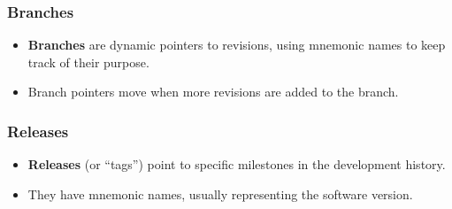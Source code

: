 \documentclass[aspectratio=169,xcolor=table]{beamer}
\begin{document}
    \begin{frame}
        \frametitle{Branches}
        \begin{block}{}
            \begin{itemize}
                \item \textbf{Branches} are dynamic pointers to revisions,
                    using mnemonic names to keep track of their purpose.
                \item Branch pointers move when more revisions are added to the
                    branch.
            \end{itemize}
        \end{block}
        \vfill
        \begin{figure}
            \centering
            \scalebox{0.8}{}
        \end{figure}
    \end{frame}

    \begin{frame}
        \frametitle{Releases}
        \begin{block}{}
            \begin{itemize}
                \item \textbf{Releases} (or ``tags'') point to specific
                    milestones in the development history.
                \item They have mnemonic names, usually representing the
                    software version.
            \end{itemize}
        \end{block}
        \vfill
        \begin{figure}
            \centering
            \scalebox{0.8}{}
        \end{figure}
    \end{frame}
\end{document}
